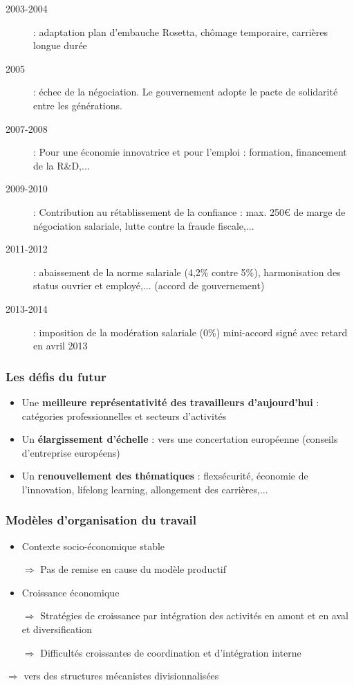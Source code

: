 \documentclass[12pt]{beamer}
\begin{document}
  \begin{frame}
    \begin{description}
     \item[2003-2004] : adaptation plan d'embauche Rosetta, chômage temporaire, carrières longue durée
     \item[2005] : échec de la négociation. Le gouvernement adopte le pacte de solidarité entre les générations.
     \item[2007-2008] : Pour une économie innovatrice et pour l'emploi : formation, financement de la R\&D,...
     \item[2009-2010] : Contribution au rétablissement de la confiance : max. 250\euro{} de marge de négociation salariale, lutte contre la fraude fiscale,...
     \item[2011-2012] : abaissement de la norme salariale (4,2\% contre 5\%), harmonisation des status ouvrier et employé,... (accord de gouvernement)
     \item[2013-2014] : imposition de la modération salariale (0\%) \og{} mini-accord \fg{} signé avec retard en avril 2013
    \end{description}
  \end{frame}
  
  \begin{frame}
    \frametitle{Les défis du futur}
    
    \begin{itemize}
     \item Une \textbf{meilleure représentativité des travailleurs d'aujourd'hui} : catégories professionnelles et secteurs d'activités
     \item Un \textbf{élargissement d'échelle} : vers une concertation européenne (conseils d'entreprise européens)
     \item Un \textbf{renouvellement des thématiques} : flexsécurité, économie de l'innovation, lifelong learning, allongement des carrières,...
    \end{itemize}
    
  \end{frame}
  
  \begin{frame}
    \frametitle{Modèles d'organisation du travail}
    
    \begin{itemize}
     \item Contexte socio-économique stable
     
	 $\Rightarrow$ Pas de remise en cause du modèle productif
	 
     \item Croissance économique
     
	 $\Rightarrow$ Stratégies de croissance par intégration des activités en amont et en aval et diversification
	 
	 $\Rightarrow$ Difficultés croissantes de coordination et d'intégration interne
	 
    \end{itemize}
    
    $\Rightarrow$ vers des structures mécanistes divisionnalisées
    
  \end{frame}
  
\end{document}
